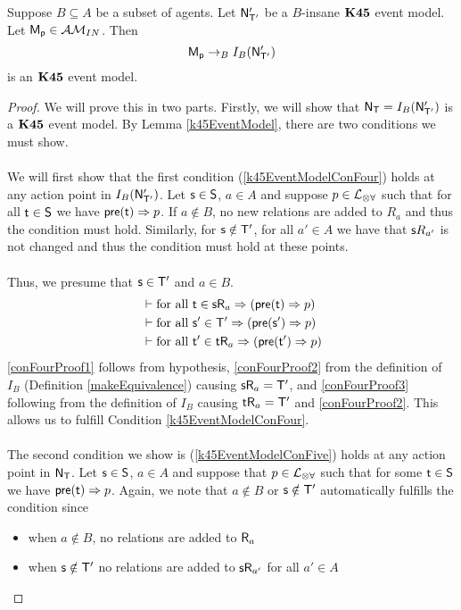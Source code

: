 \begin{lemma}
	Suppose $B \subseteq A$ be a subset of agents.
	Let $\mathrm{\mathsf{N}}'_{\mathrm{\mathsf{T}}'}$ be a $B$-insane $\bf K45$ event model.
	Let $\mathrm{\mathsf{M_p}} \in \mathcal{AM}_{IN}$.
	Then
	\[
		\mathrm{\mathsf{M_p}} \to_B I_B(\mathrm{\mathsf{N}}'_{\mathrm{\mathsf{T}}'})
	\]
	is an $\bf K45$ event model.
\end{lemma}
\begin{proof}
	We will prove this in two parts.
	Firstly, we will show that $\mathrm{\mathsf{N}}_\mathrm{\mathsf{T}} = I_B(\mathrm{\mathsf{N}}'_{\mathrm{\mathsf{T}}'})$ is a $\bf K45$ event model.
	By Lemma \ref{k45EventModel}, there are two conditions we must show.\\
	\\
	We will first show that the first condition (\ref{k45EventModelConFour}) holds at any action point
	in $I_B(\mathrm{\mathsf{N}}'_{\mathrm{\mathsf{T}}'})$.
	Let $\mathrm{\mathsf{s}} \in \mathrm{\mathsf{S}}$, $a \in A$ and suppose $p \in \mathcal{L}_{\otimes\forall}$ such that for all $\mathrm{\mathsf{t}} \in
	\mathrm{\mathsf{S}}$ we have $\mathrm{\mathsf{pre}}(\mathrm{\mathsf{t}}) \Rightarrow p$.
	If $a \notin B$, no new relations are added to $R_a$ and thus the condition must hold.
	Similarly, for $\mathrm{\mathsf{s}} \notin \mathrm{\mathsf{T}}'$, for all $a' \in A$ we have that $\mathrm{\mathsf{s}} R_{a'}$ is not changed and
	thus the condition must hold at these points.\\
	\\
	Thus, we presume that $\mathrm{\mathsf{s}} \in \mathrm{\mathsf{T}}'$ and $a \in B$.
	\begin{align}
		& \vdash \text{for all } \mathrm{\mathsf{t}} \in \mathrm{\mathsf{s}} \mathrm{\mathsf{R}}_a \Rightarrow (\mathrm{\mathsf{pre}}(\mathrm{\mathsf{t}}) \Rightarrow p)
		\label{conFourProof1} \\
		& \vdash \text{for all } \mathrm{\mathsf{s}}' \in \mathrm{\mathsf{T}}' \Rightarrow (\mathrm{\mathsf{pre}}(\mathrm{\mathsf{s}}') \Rightarrow p)
		\label{conFourProof2} \\
		& \vdash \text{for all } \mathrm{\mathsf{t}}' \in \mathrm{\mathsf{t}} \mathrm{\mathsf{R}}_a \Rightarrow (\mathrm{\mathsf{pre}}(\mathrm{\mathsf{t}}') \Rightarrow p)
		\label{conFourProof3}
	\end{align}
	\ref{conFourProof1} follows from hypothesis, \ref{conFourProof2} from the definition of $I_B$
	(Definition \ref{makeEquivalence}) causing $\mathrm{\mathsf{s}} \mathrm{\mathsf{R}}_a = \mathrm{\mathsf{T}}'$, and \ref{conFourProof3} following
	from the definition of $I_B$ causing $\mathrm{\mathsf{t}} \mathrm{\mathsf{R}}_a = \mathrm{\mathsf{T}}'$ and \ref{conFourProof2}.
	This allows us to fulfill Condition \ref{k45EventModelConFour}.\\
	\\
	The second condition we show is (\ref{k45EventModelConFive}) holds at any action point in
	$\mathrm{\mathsf{N}}_\mathrm{\mathsf{T}}$.
	Let $\mathrm{\mathsf{s}} \in \mathrm{\mathsf{S}}$, $a \in A$ and suppose that $p \in \mathcal{L}_{\otimes\forall}$ such that for some $\mathrm{\mathsf{t}} \in \mathrm{\mathsf{S}}$ 
	we have $\mathrm{\mathsf{pre}}(\mathrm{\mathsf{t}}) \Rightarrow p$.
	Again, we note that $a \notin B$ or $\mathrm{\mathsf{s}} \notin \mathrm{\mathsf{T}}'$ automatically fulfills the condition since
	\begin{itemize}
		\item when $a \notin B$, no relations are added to $\mathrm{\mathsf{R}}_a$
		\item when $\mathrm{\mathsf{s}} \notin \mathrm{\mathsf{T}}'$ no relations are added to $\mathrm{\mathsf{s}} \mathrm{\mathsf{R}}_{a'}$ for all $a' \in A$
	\end{itemize}


\end{proof}
